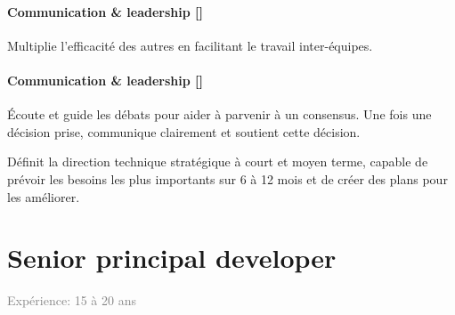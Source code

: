 \documentclass[a4paper, french, openany, 12pt]{book}
\newcommand\cha{\textcolor{RawSienna}{\textbf{Communication \& leadership [\bsc{CHA}]}}}
\newcommand\xp[1]{\textcolor{Gray}{Expérience: {#1} ans}}
\begin{document}
\begin{multicols}{2}
  \subsubsection*{\cha}

  Multiplie l'efficacité des autres en facilitant le travail inter-équipes.

  \subsubsection*{\cha}

  Écoute et guide les débats pour aider à parvenir à un consensus.
  Une fois une décision prise, communique clairement et soutient cette décision.

  Définit la direction technique stratégique à court et moyen terme, capable de prévoir les besoins les plus importants 
  sur 6 à 12 mois et de créer des plans pour les améliorer.

\end{multicols}

\chapter{Senior principal developer}

\xp{15 à 20}
\end{document}
